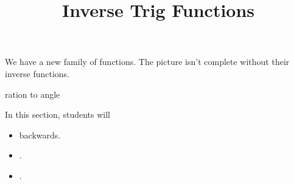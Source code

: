 \documentclass{ximera}
\title{Inverse Trig Functions}
\begin{document}
\begin{abstract}
%
\end{abstract}
\maketitle





We have a new family of functions. The picture isn't complete without their inverse functions.



ration to angle














\begin{sectionOutcomes}
In this section, students will 

\begin{itemize}
\item backwards.
\item .
\item .
\end{itemize}
\end{sectionOutcomes}
\end{document}
